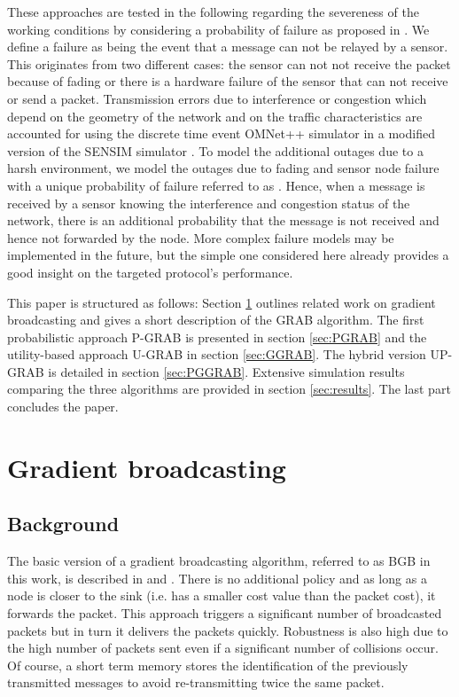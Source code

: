 \documentclass[journal, peerreview, onecolumn, draftcls]{IEEEtran}
\begin{document}
These approaches are tested in the following regarding the severeness of the working conditions by considering a probability of failure as proposed in \cite{GRAB05}. We define a failure as being the event that a message can not be relayed by a sensor. This originates from two different cases:  the sensor can not not receive the packet because of fading or  there is a hardware failure of the sensor that can not receive or send a packet.
Transmission errors due to interference or congestion which depend on the geometry of the network and on the traffic characteristics are accounted for using the discrete time event OMNet++ simulator in a modified version of the SENSIM simulator \cite{LSUsimulator}. To model the additional outages due to a harsh environment, we model the outages due to fading and sensor node failure with a unique probability of failure referred to as . Hence, when a message is received by a sensor knowing the interference and congestion status of the network, there is an additional probability  that the message is not received and hence not forwarded by the node. More complex failure models may be implemented in the future, but the simple one considered here already provides a good insight on the targeted protocol's performance.

This paper is structured as follows: Section \ref{sec:gradientbroadcasting} outlines related work on gradient broadcasting and gives a short description of the GRAB algorithm. The first probabilistic approach P-GRAB is presented in section \ref{sec:PGRAB} and the utility-based approach U-GRAB in section \ref{sec:GGRAB}. The hybrid version UP-GRAB is detailed in section \ref{sec:PGGRAB}. Extensive simulation results comparing the three algorithms are provided in section \ref{sec:results}. The last part concludes the paper.


\section{Gradient broadcasting}\label{sec:gradientbroadcasting}

\subsection{Background}\label{subsec:background}

The basic version of a gradient broadcasting algorithm, referred to as BGB in this work, is described in \cite{Maroti04} and \cite{Poor}. There is no additional policy and as long as a node is closer to the sink (i.e. has a smaller cost value than the packet cost), it forwards the packet. This approach triggers a significant number of broadcasted packets but in turn it delivers the packets quickly. Robustness is also high due to the high number of packets sent even if a significant number of collisions occur. Of course, a short term memory stores the identification of the previously transmitted messages to avoid re-transmitting twice the same packet.
\end{document}
